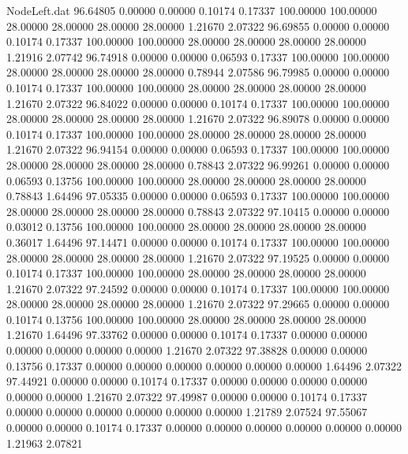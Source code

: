 \begin{filecontents}{NodeLeft.dat}
  96.64805    0.00000    0.00000     0.10174    0.17337  100.00000  100.00000   28.00000   28.00000   28.00000   28.00000    1.21670    2.07322
  96.69855    0.00000    0.00000     0.10174    0.17337  100.00000  100.00000   28.00000   28.00000   28.00000   28.00000    1.21916    2.07742
  96.74918    0.00000    0.00000     0.06593    0.17337  100.00000  100.00000   28.00000   28.00000   28.00000   28.00000    0.78944    2.07586
  96.79985    0.00000    0.00000     0.10174    0.17337  100.00000  100.00000   28.00000   28.00000   28.00000   28.00000    1.21670    2.07322
  96.84022    0.00000    0.00000     0.10174    0.17337  100.00000  100.00000   28.00000   28.00000   28.00000   28.00000    1.21670    2.07322
  96.89078    0.00000    0.00000     0.10174    0.17337  100.00000  100.00000   28.00000   28.00000   28.00000   28.00000    1.21670    2.07322
  96.94154    0.00000    0.00000     0.06593    0.17337  100.00000  100.00000   28.00000   28.00000   28.00000   28.00000    0.78843    2.07322
  96.99261    0.00000    0.00000     0.06593    0.13756  100.00000  100.00000   28.00000   28.00000   28.00000   28.00000    0.78843    1.64496
  97.05335    0.00000    0.00000     0.06593    0.17337  100.00000  100.00000   28.00000   28.00000   28.00000   28.00000    0.78843    2.07322
  97.10415    0.00000    0.00000     0.03012    0.13756  100.00000  100.00000   28.00000   28.00000   28.00000   28.00000    0.36017    1.64496
  97.14471    0.00000    0.00000     0.10174    0.17337  100.00000  100.00000   28.00000   28.00000   28.00000   28.00000    1.21670    2.07322
  97.19525    0.00000    0.00000     0.10174    0.17337  100.00000  100.00000   28.00000   28.00000   28.00000   28.00000    1.21670    2.07322
  97.24592    0.00000    0.00000     0.10174    0.17337  100.00000  100.00000   28.00000   28.00000   28.00000   28.00000    1.21670    2.07322
  97.29665    0.00000    0.00000     0.10174    0.13756  100.00000  100.00000   28.00000   28.00000   28.00000   28.00000    1.21670    1.64496
  97.33762    0.00000    0.00000     0.10174    0.17337    0.00000    0.00000    0.00000    0.00000    0.00000    0.00000    1.21670    2.07322
  97.38828    0.00000    0.00000     0.13756    0.17337    0.00000    0.00000    0.00000    0.00000    0.00000    0.00000    1.64496    2.07322
  97.44921    0.00000    0.00000     0.10174    0.17337    0.00000    0.00000    0.00000    0.00000    0.00000    0.00000    1.21670    2.07322
  97.49987    0.00000    0.00000     0.10174    0.17337    0.00000    0.00000    0.00000    0.00000    0.00000    0.00000    1.21789    2.07524
  97.55067    0.00000    0.00000     0.10174    0.17337    0.00000    0.00000    0.00000    0.00000    0.00000    0.00000    1.21963    2.07821

\end{filecontents}
